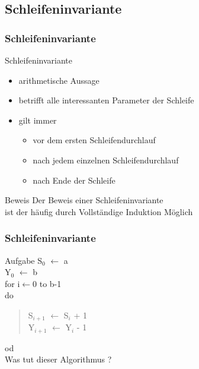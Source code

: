 \documentclass{beamer}
\begin{document}
\subsection{Schleifeninvariante}
\begin{frame}
	\frametitle{Schleifeninvariante}
	\begin{block}{Schleifeninvariante}
		\begin{itemize}
			\item arithmetische Aussage
			\item betrifft alle interessanten Parameter der Schleife
			\item gilt immer
			\begin{itemize}
				\item vor dem ersten Schleifendurchlauf
				\item nach jedem einzelnen Schleifendurchlauf
				\item nach Ende der Schleife
			\end{itemize}		
		\end{itemize}
	\end{block}
	
	\begin{block}{Beweis}
		Der Beweis einer Schleifeninvariante \\ 
		ist der häufig durch Vollständige Induktion Möglich
	\end{block}
\end{frame}

\begin{frame}
	\frametitle{Schleifeninvariante}
	\begin{block}{Aufgabe}
 		S$_0$ $\leftarrow$ a \\
 		Y$_0$ $\leftarrow$ b \\
		for i$\leftarrow$0 to b-1 \\
		do \\
		\begin{quote}
			S$_{i+1}$ $\leftarrow$ S$_i$ + 1 \\
			Y$_{i+1}$ $\leftarrow$ Y$_i$ - 1
		\end{quote}
		od \\
		Was tut dieser Algorithmus ?
	\end{block}
\end{frame}
\end{document}
